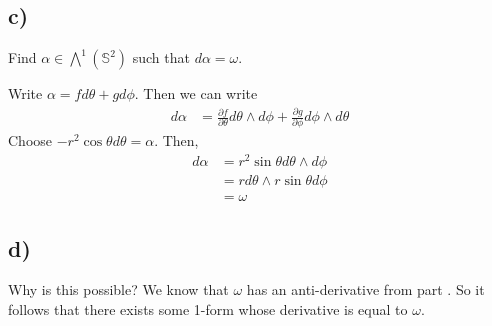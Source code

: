 \documentclass{article}
\theoremstyle{definition}
\begin{document}
\subsection*{c)}
\begin{mdframed}
    Find $\alpha \in \bigwedge^1(\mathbb{S}^2)$ such that $d\alpha = \omega$.
\end{mdframed}
Write $\alpha = fd\theta + gd\phi$. Then we can write 
\begin{align}
    d\alpha &=\frac{\partial f}{\partial\theta}d\theta \wedge d\phi + \frac{\partial g}{\partial \phi}d\phi \wedge d\theta
\end{align}
Choose $-r^2\cos\theta d\theta = \alpha$. Then,
\begin{align}
    d\alpha &= r^2 \sin\theta d\theta \wedge d\phi \\
    &= rd\theta \wedge r\sin\theta d\phi\\
    &= \omega
\end{align}
\subsection*{d)}
Why is this possible?
We know that $\omega$ has an anti-derivative from part . So it follows that there exists some
1-form whose derivative is equal to $\omega$.
\end{document}
